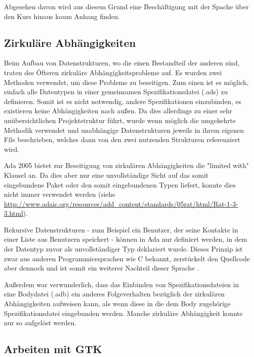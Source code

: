\documentclass[12pt,a4paper,bibliography=totocnumbered,listof=totocnumbered]{scrartcl}
\begin{document}
Abgesehen davon wird aus diesem Grund eine Beschäftigung mit der Spache über den Kurs hinaus kaum Anhang finden.

\subsection{Zirkuläre Abhängigkeiten}
Beim Aufbau von Datenstrukturen, wo die einen Bestandteil der anderen sind, traten des Öfteren zirkuläre Abhängigkeitsprobleme auf. Es wurden zwei Methoden verwendet, um diese Probleme zu beseitigen. Zum einen ist es möglich, einfach alle Datentypen in einer gemeinsamen Spezifikationsdatei (.ads) zu definieren. Somit ist es nicht notwendig, andere Spezifikationen einzubinden, es existieren keine Abhängigkeiten nach außen. Da dies allerdings zu einer sehr unübersichtlichen Projektstruktur führt, wurde wenn möglich die umgekehrte Methodik verwendet und unabhängige Datenstrukturen jeweils in ihrem eigenen File beschrieben, welches dann von den zwei nutzenden Strukturen referenziert wird.

Ada 2005 bietet zur Beseitigung von zirkulären Abhängigkeiten die "limited with" Klausel an. Da dies aber nur eine unvollständige Sicht auf das somit eingebundene Paket oder den somit eingebundenen Typen liefert, konnte dies nicht immer verwendet werden (siehe \url{http://www.adaic.org/resources/add_content/standards/05rat/html/Rat-1-3-3.html}).


Rekursive Datenstrukturen - zum Beispiel ein Benutzer, der seine Kontakte in einer Liste aus Benutzern speichert - können in Ada nur definiert werden, in dem der Datentyp zuvor als unvollständiger Typ deklariert wurde. Dieses Prinzip ist zwar aus anderen Programmiersprachen wie C bekannt, zerstückelt den Quellcode aber dennoch und ist somit ein weiterer Nachteil dieser Sprache .


Außerdem war verwunderlich, dass das Einbinden von Spezifikationsdateien in eine Bodydatei (.adb) ein anderes Folgeverhalten bezüglich der zirkulären Abhängigkeiten aufweisen kann, als wenn diese in die dem Body zugehörige Spezifikationsdatei eingebunden werden. Manche zirkuläre Abhängigkeit konnte nur so aufgelöst werden.

\subsection{Arbeiten mit GTK}
\end{document}
